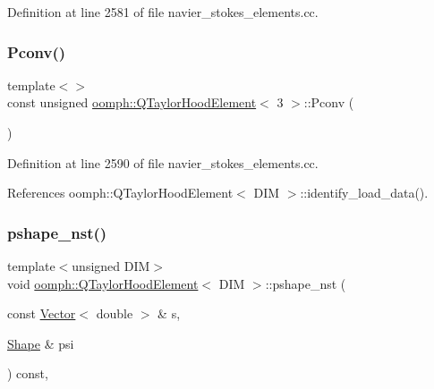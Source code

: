 Definition at line 2581 of file navier\+\_\+stokes\+\_\+elements.\+cc.

\mbox{\label{classoomph_1_1QTaylorHoodElement_a6ea5227ee36c770ef52601a237e89caf}} 
\subsubsection{\texorpdfstring{Pconv()}{Pconv()}\hspace{0.1cm}{\footnotesize\ttfamily [2/2]}}
{\footnotesize\ttfamily template$<$$>$ \\
const unsigned \hyperlink{classoomph_1_1QTaylorHoodElement}{oomph\+::\+Q\+Taylor\+Hood\+Element}$<$ 3 $>$\+::Pconv (\begin{DoxyParamCaption}{ }\end{DoxyParamCaption})\hspace{0.3cm}{\ttfamily [protected]}}



Definition at line 2590 of file navier\+\_\+stokes\+\_\+elements.\+cc.



References oomph\+::\+Q\+Taylor\+Hood\+Element$<$ D\+I\+M $>$\+::identify\+\_\+load\+\_\+data().

\mbox{\label{classoomph_1_1QTaylorHoodElement_a791d591c9dbcc18f5843dd0df3a5210c}} 
\subsubsection{\texorpdfstring{pshape\+\_\+nst()}{pshape\_nst()}\hspace{0.1cm}{\footnotesize\ttfamily [1/4]}}
{\footnotesize\ttfamily template$<$unsigned D\+IM$>$ \\
void \hyperlink{classoomph_1_1QTaylorHoodElement}{oomph\+::\+Q\+Taylor\+Hood\+Element}$<$ D\+IM $>$\+::pshape\+\_\+nst (\begin{DoxyParamCaption}\item[{const \hyperlink{classoomph_1_1Vector}{Vector}$<$ double $>$ \&}]{s,  }\item[{\hyperlink{classoomph_1_1Shape}{Shape} \&}]{psi }\end{DoxyParamCaption}) const\hspace{0.3cm}{\ttfamily [inline]}, {\ttfamily [virtual]}}



